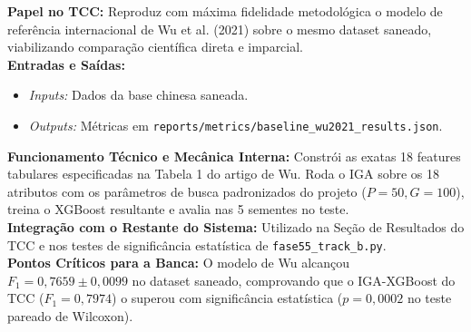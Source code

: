 \documentclass[10pt,a4paper]{article}
\begin{document}
\begin{filebox}
\textbf{Papel no TCC:} Reproduz com máxima fidelidade metodológica o modelo de referência internacional de Wu et al. (2021) sobre o mesmo dataset saneado, viabilizando comparação científica direta e imparcial.\\
\textbf{Entradas e Saídas:}
\begin{itemize}[leftmargin=*,itemsep=1pt]
  \item \textit{Inputs:} Dados da base chinesa saneada.
  \item \textit{Outputs:} Métricas em \texttt{reports/metrics/baseline\_wu2021\_results.json}.
\end{itemize}
\textbf{Funcionamento Técnico e Mecânica Interna:} Constrói as exatas 18 features tabulares especificadas na Tabela 1 do artigo de Wu. Roda o IGA sobre os 18 atributos com os parâmetros de busca padronizados do projeto ($P=50, G=100$), treina o XGBoost resultante e avalia nas 5 sementes no teste.\\
\textbf{Integração com o Restante do Sistema:} Utilizado na Seção de Resultados do TCC e nos testes de significância estatística de \texttt{fase55\_track\_b.py}.\\
\textbf{Pontos Críticos para a Banca:} O modelo de Wu alcançou $F_1 = 0,7659 \pm 0,0099$ no dataset saneado, comprovando que o IGA-XGBoost do TCC ($F_1 = 0,7974$) o superou com significância estatística ($p = 0,0002$ no teste pareado de Wilcoxon).
\end{filebox}
\end{document}
